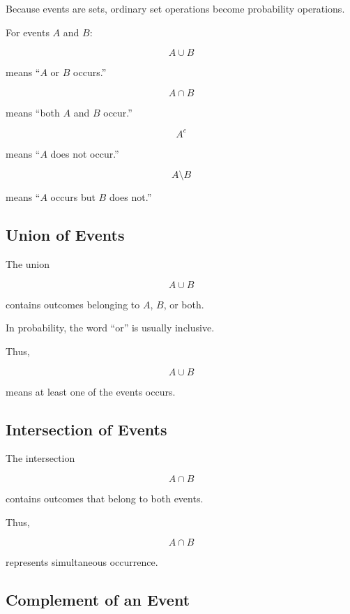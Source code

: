 Because events are sets, ordinary set operations become probability
operations.

For events \(A\) and \(B\):

\[
A\cup B
\]

means ``\(A\) or \(B\) occurs.''

\[
A\cap B
\]

means ``both \(A\) and \(B\) occur.''

\[
A^c
\]

means ``\(A\) does not occur.''

\[
A\setminus B
\]

means ``\(A\) occurs but \(B\) does not.''

\subsection{Union of Events}
\label{subsec:event-union}

The union

\[
\boxed{
A\cup B
}
\]

contains outcomes belonging to \(A\), \(B\), or both.

In probability, the word ``or'' is usually inclusive.

Thus,

\[
A\cup B
\]

means at least one of the events occurs.

\subsection{Intersection of Events}
\label{subsec:event-intersection}

The intersection

\[
\boxed{
A\cap B
}
\]

contains outcomes that belong to both events.

Thus,

\[
A\cap B
\]

represents simultaneous occurrence.

\subsection{Complement of an Event}
\label{subsec:event-complement}

